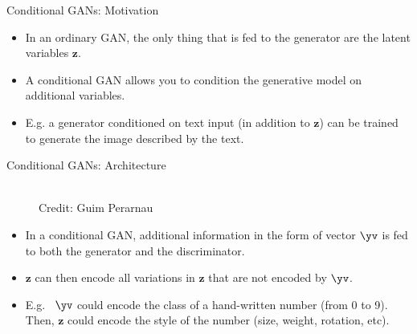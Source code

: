 \begin{frame} {Conditional GANs: Motivation}
  \begin{itemize}
    \item In an ordinary GAN, the only thing that is fed to the generator are the latent variables $\mathbf{z}$.
    \item A conditional GAN allows you to condition the generative model on additional variables. %
    \item E.g. a generator conditioned on text input (in addition to $\mathbf{z}$) can be trained to generate the image described by the text.
  \end{itemize}
\end{frame}

\begin{frame} {Conditional GANs: Architecture}
  \begin{figure}
    \centering
      \tiny{\\Credit: Guim Perarnau}
  \end{figure}
  \begin{itemize}
    \item In a conditional GAN, additional information in the form of vector $\yv$  is fed to both the generator and the discriminator.
    \item $\mathbf{z}$  can then encode all  variations in $\mathbf{z}$ that are not encoded by $\yv$.
    \item E.g.~ $\yv$ could encode the class of a hand-written number (from 0 to 9). Then,  $\mathbf{z}$ could encode  the style of the number (size, weight, rotation, etc).
  \end{itemize}
\end{frame}


